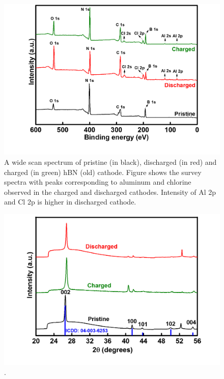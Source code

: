 \begin{figure}[tbh!]
\centering
\includegraphics[width=\textwidth]{Figures/BOhBN/hBNXPS}
\caption{A wide scan spectrum of pristine (in black), discharged (in red) and charged (in green) hBN (old) cathode. Figure shows the survey spectra with peaks corresponding to aluminum and chlorine observed in the charged and discharged cathodes. Intensity of Al 2p and Cl 2p is higher in discharged cathode.}
\label{Figures/BOhBN:hBNXPS}
\end{figure}

\begin{figure}[tbh!]
\centering
\includegraphics[width=\textwidth]{Figures/BOhBN/hBNXRD2}
\caption{.}
\label{Figures/BOhBN:hBNXRD2}
\end{figure}

